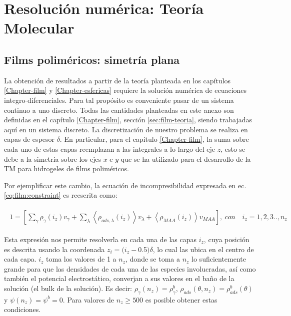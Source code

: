 \chapter{Resoluci\'on num\'erica: Teor\'ia Molecular}\label{sec:film:reso-numerica}


\section{Films polim\'ericos: simetr\'ia plana}

La obtenci\'on de resultados a partir de la teor\'ia planteada en los cap\'itulos \ref{Chapter-film} y \ref{Chapter-esfericas} requiere la soluci\'on num\'erica de ecuaciones integro-diferenciales. Para tal prop\'osito es conveniente pasar de un sistema continuo a uno discreto. 
Todas las cantidades planteadas en este anexo son definidas en el cap\'itulo \ref{Chapter-film}, secci\'on \ref{sec:film-teoria}, siendo trabajadas aqu\'i en un sistema discreto.
La discretizaci\'on de nuestro problema se realiza en capas de espesor $\delta$. 
En particular, para el cap\'itulo \ref{Chapter-film}, la suma sobre cada uno de estas capas reemplazan a las integrales a lo largo del eje $z$, esto se debe a la simetr\'ia sobre los ejes $x$ e $y$ que se ha utilizado para el desarrollo de la TM para hidrogeles de films polim\'ericos.


Por ejemplificar este cambio, la ecuaci\'on de incompresibilidad expresada en ec. \ref{eq:film:constraint} es reescrita como:


\begin{align}
	\begin{aligned}
		1=  {\left[\sum_{\gamma}\rho_\gamma(i_z) v_\gamma + \sum_\lambda{\left<\rho_{ads,\lambda}(i_z)\right>v_\lambda} + \left<\rho_{MAA}(i_z)\right>v_{MAA} \right]},~ con \quad  i_z =1,2,3.., n_z
	\end{aligned}
	\label{eq:film:discreto-constraint}
\end{align}

Esta expresi\'on nos permite resolverla en cada una de las capas $i_z$, cuya posici\'on es descrita usando la coordenada $z_i = (i_z -$0.5$)\delta$, lo cual las ubica en el centro de cada capa. $i_z$ toma los valores de 1 a $n_z$, donde se toma a $n_z$ lo suficientemente grande para que las densidades de cada una de las especies involucradas, as\'i como tambi\'en el potencial electrost\'atico, converjan a sus valores en el ba\~no de la soluci\'on (el bulk de la soluci\'on).
Es decir: $\rho_\gamma(n_z) = \rho^b_\gamma$, $\rho_{ads}(\theta,n_z) = \rho^b_{ads}(\theta)$ y $\psi(n_z) = \psi^b =0$.
Para valores de $n_z \geq 500$ es posible obtener estas condiciones.

